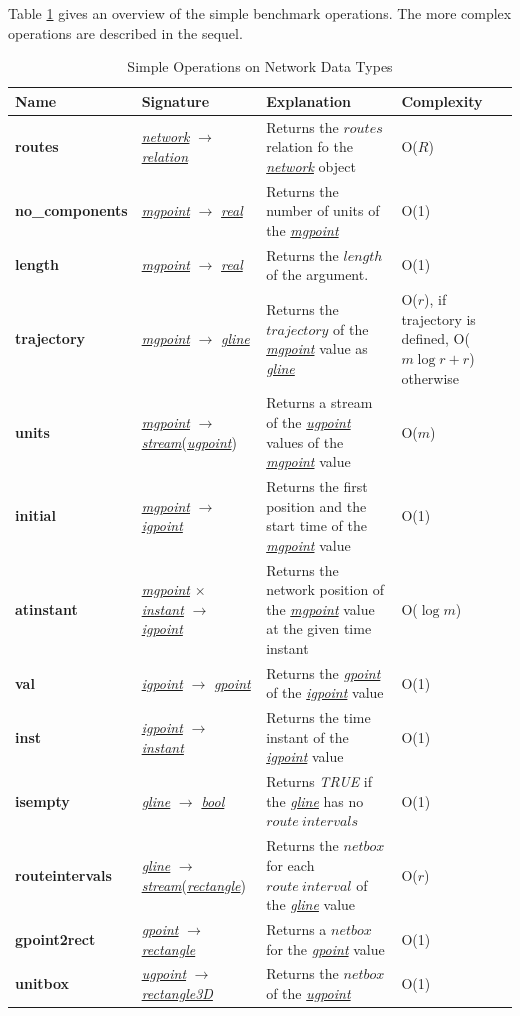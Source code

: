 \documentclass[a4paper]{article}
\newcommand{\op}[1]{\textbf{#1}}
\newcommand{\dt}[1]{\textsl{\underline{#1}}}
\newcommand{\true}{\textsl{TRUE}}
\begin{document}
Table \ref{tab:simplenetoperations} gives an overview of the simple benchmark
operations. The more complex operations are described in the sequel.
\begin{table}
  \caption{Simple Operations on Network Data Types}
  \label{tab:simplenetoperations}
  \begin{center}
  \begin{tabularx}{1.0\textwidth}{|l|l|X|X|}
  \hline
  \textbf{Name}& \textbf{Signature}& \textbf{Explanation}& \textbf{Complexity}\\
  \hline
\op{routes}& \dt{network} $\rightarrow$ \dt{relation} & Returns the $routes$
relation fo the \dt{network} object & O($R$)\\
  \hline
\op{no\_components}&\dt{mgpoint} $\rightarrow$ \dt{real}& Returns the number of
units of the \dt{mgpoint} &O(1)\\
  \hline
\op{length}&\dt{mgpoint} $\rightarrow$ \dt{real}& Returns the $length$ of the
argument.&O(1)\\
  \hline
\op{trajectory}&\dt{mgpoint} $\rightarrow$ \dt{gline}& Returns the $trajectory$
of the \dt{mgpoint} value as \dt{gline}&O($r$), if trajectory is defined, O($m \log r + r$) otherwise\\
  \hline
\op{units}&\dt{mgpoint} $\rightarrow$ \dt{stream}(\dt{ugpoint})& Returns a
stream
of the \dt{ugpoint} values of the \dt{mgpoint} value& O($m$)\\
  \hline
\op{initial}&\dt{mgpoint} $\rightarrow$ \dt{igpoint}& Returns the first position
and the start time of the \dt{mgpoint} value& O(1)\\
  \hline
\op{atinstant}&\dt{mgpoint} $\times$ \dt{instant} $\rightarrow$ \dt{igpoint}&
Returns the network position of the \dt{mgpoint} value at the given time instant&
O($\log m$)\\
  \hline
\op{val}&\dt{igpoint} $\rightarrow$ \dt{gpoint}& Returns the \dt{gpoint} of the
\dt{igpoint} value&O(1)\\
  \hline
\op{inst}&\dt{igpoint} $\rightarrow$ \dt{instant}& Returns the time instant of the
\dt{igpoint} value &O(1)\\
  \hline
\op{isempty}&\dt{gline} $\rightarrow$ \dt{bool}& Returns \true{} if the \dt{gline}
has no $route\ intervals$ & O(1)\\
  \hline
\op{routeintervals}&\dt{gline} $\rightarrow$ \dt{stream}(\dt{rectangle})& Returns
the $netbox$ for each $route\ interval$ of the \dt{gline} value& O($r$)\\
  \hline
\op{gpoint2rect}& \dt{gpoint} $\rightarrow$ \dt{rectangle} & Returns a $netbox$
for the \dt{gpoint} value & O(1)\\
\hline
\op{unitbox}& \dt{ugpoint} $\rightarrow$ \dt{rectangle3D} & Returns the $netbox$
of the \dt{ugpoint} & O(1)\\
  \hline
  \end{tabularx}
  \end{center}
\end{table}
\end{document}

